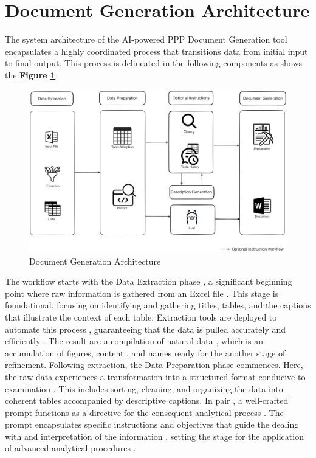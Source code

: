 \section{Document Generation Architecture}
The system architecture of the AI-powered PPP Document Generation tool encapsulates a highly coordinated process that transitions data from initial input to final output. This process is delineated in the following components as shows the \textbf{Figure \ref{fig:reportGen}}:
\begin{figure}[H]
    \label{fig:reportGen}
    \centering
    \includegraphics[width=1 \linewidth]{assets/docGenfin.png}
    \caption{Document Generation Architecture }
\end{figure}
The workflow starts with the Data Extraction phase , a significant beginning point where raw information is gathered from an Excel file . This stage is foundational, focusing on identifying and gathering titles, tables, and the captions that illustrate the context of each table. Extraction tools are deployed to automate this process , guaranteeing that the data is pulled accurately and efficiently . The result are a compilation of natural data , which is an accumulation of figures, content , and names ready for the another stage of refinement.
\vskip 0.5cm
Following extraction, the Data Preparation phase commences. Here, the raw data experiences a transformation into a structured format conducive to examination . This includes sorting, cleaning, and organizing the data into coherent tables accompanied by descriptive captions. In pair , a well-crafted prompt functions as a directive for the consequent analytical process . The prompt encapsulates specific instructions and objectives that guide the dealing with and interpretation of the information , setting the stage for the application of advanced analytical procedures .
